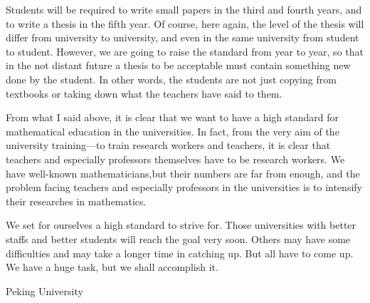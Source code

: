 Students will be required to write small papers in the third and fourth years, and to write a thesis in the fifth year. Of course, here again, the level of the thesis will differ from university to university, and even in the same university from student to student. However, we are going to raise the standard from year to year, so that in the not distant future a thesis to be acceptable must contain something new done by the student. In other words, the students are not just copying from textbooks or taking down what the teachers have said to them.

From what I said above, it is clear that we want to have a high standard for mathematical education in the universities. In fact, from the very aim of the university training---to train research workers and teachers, it is clear that teachers and especially professors themselves have to be research workers. We have well-known mathematicians,\pageoriginale but their numbers are far from enough, and the problem facing teachers and especially professors in the universities is to intensify their researches in mathematics.

\eject

We set for ourselves a high standard to strive for. Those universities with better staffs and better students will reach the goal very soon. Others may have some difficulties and may take a longer time in catching up. But all have to come up. We have a huge task, but we shall accomplish it.

\bigskip
\medskip
{\fontsize{9pt}{11pt}\selectfont
Peking University}\relax

